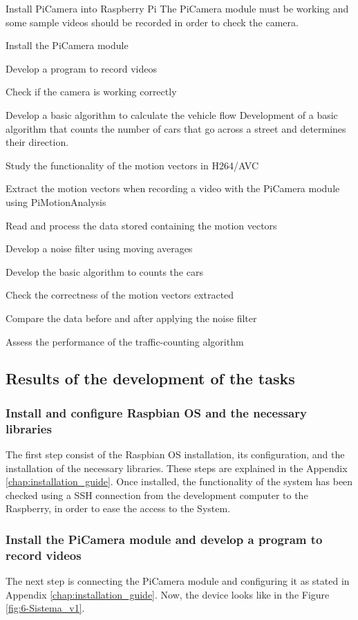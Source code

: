 {Install PiCamera into Raspberry Pi}
{The PiCamera module must be working and some sample videos should be recorded in order to check the camera.}
{	\item Install the PiCamera module
	\item Develop a program to record videos
}{	\item Check if the camera is working correctly
}

{Develop a basic algorithm to calculate the vehicle flow}
{Development of a basic algorithm that counts the number of cars that go across a street and determines their direction.}
{	\item Study the functionality of the motion vectors in H264/AVC
	\item Extract the motion vectors when recording a video with the PiCamera module using PiMotionAnalysis
	\item Read and process the data stored containing the motion vectors
	\item Develop a noise filter using moving averages
	\item Develop the basic algorithm to counts the cars
}{	\item Check the correctness of the motion vectors extracted
	\item Compare the data before and after applying the noise filter
	\item Assess the performance of the traffic-counting algorithm
}


\subsection{Results of the development of the tasks}
\subsubsection{Install and configure Raspbian \ac{OS} and the necessary libraries}
The first step consist of the Raspbian \ac{OS} installation, its configuration, and the installation of the necessary libraries. These steps are explained in the Appendix \ref{chap:installation_guide}. Once installed, the functionality of the system has been checked using a SSH connection from the development computer to the Raspberry, in order to ease the access to the System. 

\subsubsection{Install the PiCamera module and develop a program to record videos}
The next step is connecting the PiCamera module and configuring it as stated in Appendix \ref{chap:installation_guide}. Now, the device looks like in the Figure \ref{fig:6-Sistema_v1}. 

